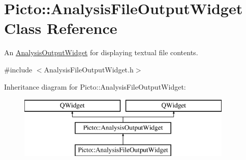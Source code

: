 \hypertarget{class_picto_1_1_analysis_file_output_widget}{\section{Picto\-:\-:Analysis\-File\-Output\-Widget Class Reference}
\label{class_picto_1_1_analysis_file_output_widget}
}


An \hyperlink{class_picto_1_1_analysis_output_widget}{Analysis\-Output\-Widget} for displaying textual file contents.  




{\ttfamily \#include $<$Analysis\-File\-Output\-Widget.\-h$>$}

Inheritance diagram for Picto\-:\-:Analysis\-File\-Output\-Widget\-:\begin{figure}[H]
\begin{center}
\leavevmode
\includegraphics[height=3.000000cm]{class_picto_1_1_analysis_file_output_widget}
\end{center}
\end{figure}
